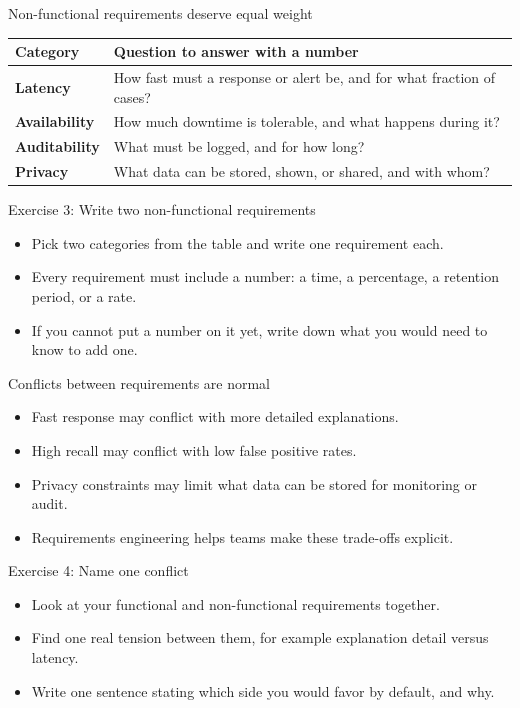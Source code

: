 \begin{frame}{Non-functional requirements deserve equal weight}
\begin{tabularx}{\textwidth}{>{\bfseries}l X}
Category & Question to answer with a number \\
\toprule
Latency & How fast must a response or alert be, and for what fraction of cases? \\
Availability & How much downtime is tolerable, and what happens during it? \\
Auditability & What must be logged, and for how long? \\
Privacy & What data can be stored, shown, or shared, and with whom? \\
\bottomrule
\end{tabularx}
\coursefooter
\end{frame}

\begin{frame}{Exercise 3: Write two non-functional requirements}
\begin{itemize}
\item Pick two categories from the table and write one requirement each.
\item Every requirement must include a number: a time, a percentage, a retention period, or a rate.
\item If you cannot put a number on it yet, write down what you would need to know to add one.
\end{itemize}
\coursefooter
\end{frame}

\begin{frame}{Conflicts between requirements are normal}
\begin{itemize}
\item Fast response may conflict with more detailed explanations.
\item High recall may conflict with low false positive rates.
\item Privacy constraints may limit what data can be stored for monitoring or audit.
\item Requirements engineering helps teams make these trade-offs explicit.
\end{itemize}
\coursefooter
\end{frame}

\begin{frame}{Exercise 4: Name one conflict}
\begin{itemize}
\item Look at your functional and non-functional requirements together.
\item Find one real tension between them, for example explanation detail versus latency.
\item Write one sentence stating which side you would favor by default, and why.
\end{itemize}
\coursefooter
\end{frame}

